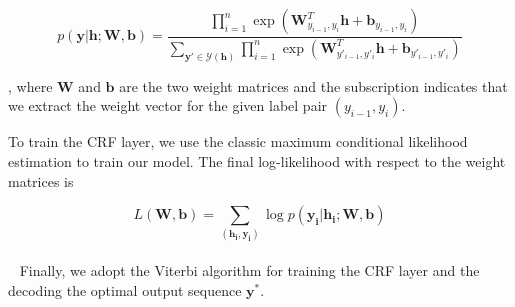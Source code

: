 {\scriptsize $$ p(\mathbf{y}|\mathbf{h}; \mathbf{W},\mathbf{b}) 
= \frac{\prod_{i=1}^n \exp(\mathbf{W}^T_{y_{i-1},y_{i}}\mathbf{h} + \mathbf{b}_{y_{i-1},y_{i}})}
{ \sum_{\mathbf{y'} \in \mathcal{Y}(\mathbf{h})} \prod_{i=1}^n \exp(\mathbf{W}^T_{y'_{i-1},y'_{i}}\mathbf{h} + \mathbf{b}_{y'_{i-1},y'_{i}})} 
$$
}

, where $\mathbf W$ and $\mathbf b$ are the two weight matrices and the subscription indicates that we extract the weight vector for the given label pair $(y_{i-1},y_i)$. 

To train the CRF layer, we use the classic maximum conditional likelihood estimation to train our model. 
The final log-likelihood with respect to the weight matrices is 

$$ L(\mathbf{W},\mathbf{b}) = \sum_{(\mathbf{h_i}, \mathbf{y_i})}  \log p(\mathbf{y_i}|\mathbf{h_i}; \mathbf{W},\mathbf{b}) $$
~\\~
Finally, we adopt the Viterbi algorithm for training the CRF layer and the decoding the optimal output sequence $\mathbf{y^*}$.



